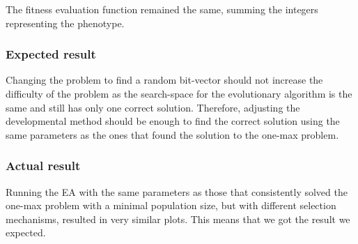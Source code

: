 \documentclass[11pt]{article}
\begin{document}
The fitness evaluation function remained the same, summing the integers representing the phenotype.

\subsubsection*{Expected result}

Changing the problem to find a random bit-vector should not increase the difficulty of
the problem as the search-space for the evolutionary algorithm is the same and still has only
one correct solution. Therefore, adjusting the developmental method should be enough to find the
correct solution using the same parameters as the ones that found the solution to the one-max problem.

\subsubsection*{Actual result}

Running the EA with the same parameters as those that consistently solved the one-max problem
with a minimal population size, but with different selection mechanisms, resulted in very similar
plots. This means that we got the result we expected.
\end{document}
